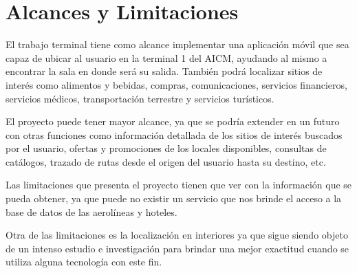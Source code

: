 \section{Alcances y Limitaciones}

El trabajo terminal tiene como alcance implementar una aplicación móvil que sea capaz de ubicar al usuario en la terminal 1 del AICM, ayudando al mismo a encontrar la sala en donde será su salida. También podrá localizar sitios de interés como alimentos y bebidas, compras, comunicaciones, servicios financieros,  servicios médicos, transportación terrestre y servicios turísticos.

El proyecto puede tener mayor alcance, ya que se podría extender en un futuro con otras funciones como información detallada de los sitios de interés buscados por el usuario, ofertas y promociones de los locales disponibles, consultas de catálogos, trazado de rutas desde el origen del usuario hasta su destino, etc.

Las limitaciones que presenta el proyecto tienen que ver con la información que se pueda obtener, ya que puede no existir un servicio que nos brinde el acceso a la base de datos de las aerolíneas y hoteles. 

Otra de las limitaciones es la localización en interiores ya que sigue siendo objeto de un intenso estudio e investigación para brindar una mejor exactitud cuando se utiliza alguna tecnología con este fin.

